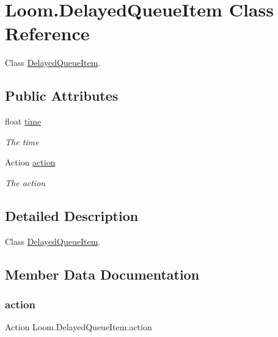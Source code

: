 \hypertarget{class_loom_1_1_delayed_queue_item}{}\section{Loom.\+Delayed\+Queue\+Item Class Reference}
\label{class_loom_1_1_delayed_queue_item}


Class \hyperlink{class_loom_1_1_delayed_queue_item}{Delayed\+Queue\+Item}.  


\subsection*{Public Attributes}
\begin{DoxyCompactItemize}
\item 
float \hyperlink{class_loom_1_1_delayed_queue_item_a31169962a9fc37e848515f0c6552c9ea}{time}
\begin{DoxyCompactList}\small\item\em The time \end{DoxyCompactList}\item 
Action \hyperlink{class_loom_1_1_delayed_queue_item_a501c4e9027169254545875db55569355}{action}
\begin{DoxyCompactList}\small\item\em The action \end{DoxyCompactList}\end{DoxyCompactItemize}


\subsection{Detailed Description}
Class \hyperlink{class_loom_1_1_delayed_queue_item}{Delayed\+Queue\+Item}. 



\subsection{Member Data Documentation}
\mbox{\label{class_loom_1_1_delayed_queue_item_a501c4e9027169254545875db55569355}} 
\subsubsection{\texorpdfstring{action}{action}}
{\footnotesize\ttfamily Action Loom.\+Delayed\+Queue\+Item.\+action}



